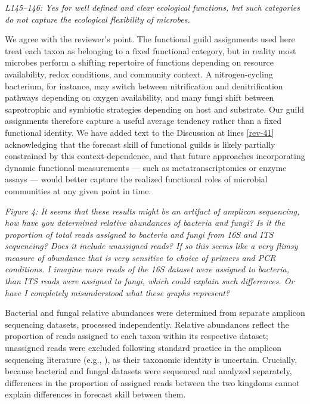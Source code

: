 \documentclass[11pt]{article}
\begin{document}
\bigskip

\textit{L145--146: Yes for well defined and clear ecological functions, but such categories do not capture the ecological flexibility of microbes.}

We agree with the reviewer's point. The functional guild assignments used here treat each taxon as belonging to a fixed functional category, but in reality most microbes perform a shifting repertoire of functions depending on resource availability, redox conditions, and community context. A nitrogen-cycling bacterium, for instance, may switch between nitrification and denitrification pathways depending on oxygen availability, and many fungi shift between saprotrophic and symbiotic strategies depending on host and substrate. Our guild assignments therefore capture a useful average tendency rather than a fixed functional identity. We have added text to the Discussion at lines \ref{rev-41} acknowledging that the forecast skill of functional guilds is likely partially constrained by this context-dependence, and that future approaches incorporating dynamic functional measurements --- such as metatranscriptomics or enzyme assays --- would better capture the realized functional roles of microbial communities at any given point in time.

\bigskip

\textit{Figure 4: It seems that these results might be an artifact of amplicon sequencing, how have you determined relative abundances of bacteria and fungi? Is it the proportion of total reads assigned to bacteria and fungi from 16S and ITS sequencing? Does it include unassigned reads? If so this seems like a very flimsy measure of abundance that is very sensitive to choice of primers and PCR conditions. I imagine more reads of the 16S dataset were assigned to bacteria, than ITS reads were assigned to fungi, which could explain such differences. Or have I completely misunderstood what these graphs represent?}

Bacterial and fungal relative abundances were determined from separate amplicon sequencing datasets, processed independently. Relative abundances reflect the proportion of reads assigned to each taxon within its respective dataset; unassigned reads were excluded following standard practice in the amplicon sequencing literature (e.g., %
), as their taxonomic identity is uncertain. Crucially, because bacterial and fungal datasets were sequenced and analyzed separately, differences in the proportion of assigned reads between the two kingdoms cannot explain differences in forecast skill between them.
\end{document}
